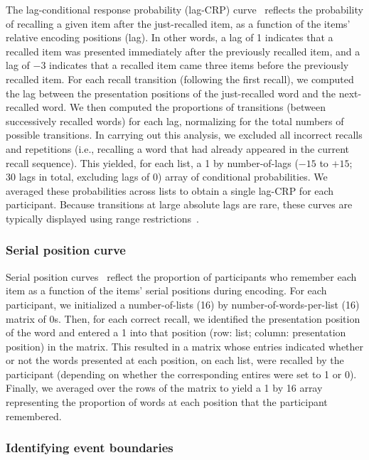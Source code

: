 \documentclass[11pt]{article}
\begin{document}
The lag-conditional response probability (lag-CRP) curve~\citep{Kaha96}
reflects the probability of recalling a given item after the just-recalled
item, as a function of the items' relative encoding positions (lag). In other words,
a lag of 1 indicates that a recalled item was presented immediately after the
previously recalled item, and a lag of $-3$ indicates that a recalled item came
three items before the previously recalled item. For each recall transition
(following the first recall), we computed the lag between the presentation positions
of the just-recalled word and the next-recalled word. 
We then computed the proportions of transitions (between successively
recalled words) for each lag, normalizing for the total numbers of possible
transitions. In carrying out this analysis, we excluded all incorrect recalls
and repetitions (i.e., recalling a word that had already appeared in
the current recall sequence). This yielded, for each list, a 1 by
number-of-lags ($-15$ to $+15$; 30 lags in total, excluding lags of 0) array of
conditional probabilities. We averaged these probabilities across lists to
obtain a single lag-CRP for each participant. Because transitions at large
absolute lags are rare, these curves are typically displayed using range
restrictions~\citep{Kaha12}.



\subsubsection*{Serial position curve}

Serial position curves~\citep{Murd62a} reflect the proportion of participants
who remember each item as a function of the items' serial positions during
encoding. For each participant, we initialized a number-of-lists (16) by
number-of-words-per-list (16) matrix of 0s. Then, for each correct recall, we
identified the presentation position of the word and entered a 1 into that
position (row: list; column: presentation position) in the matrix. This
resulted in a matrix whose entries indicated whether or not the words presented
at each position, on each list, were recalled by the participant (depending on
whether the corresponding entires were set to 1 or 0). Finally, we averaged
over the rows of the matrix to yield a 1 by 16 array representing the
proportion of words at each position that the participant remembered.

\subsubsection*{Identifying event boundaries}
\end{document}
